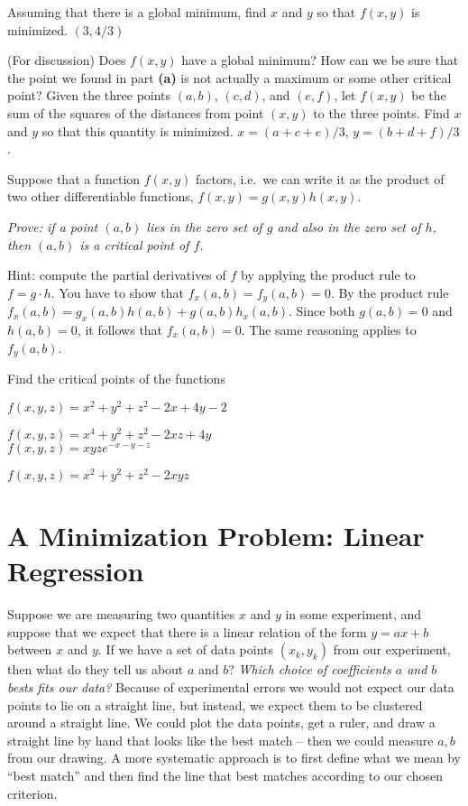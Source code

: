 \begin{multicols}{2}
\subprob Assuming that there is a global minimum, find $x$ and $y$ so that $f(x,y)$  is minimized. 
\answer  $(3,4/3)$  
\endanswer

\subprob (For discussion)  Does $f(x,y)$ have a global minimum?  How can we be sure
that the point we found in part \textbf{(a)} is not actually a maximum or some other
critical point?
%
\subprob Given the three points $(a, b)$, $(c, d)$, and $(e, f)$,  
let $f(x, y)$ be the sum of the squares of the distances from point
$(x,y)$ to the three points.  Find $x$ and $y$ so that this quantity is
minimized. 
\answer
$x= (a+c+e)/3$, $y=(b+d+f)/3$.  
\endanswer

\problem Suppose that a function $f(x, y)$ factors, i.e.~we can write it as the
product of two other differentiable functions, $f(x, y) = g(x, y)h(x, y)$.

\textit{Prove: if a point $(a, b)$ lies in the zero set of $g$ and also in the
zero set of $h$, then $(a,b)$ is a critical point of $f$.}

\noindent%
Hint: compute the partial derivatives of $f$ by applying the product rule to $f=g\cdot h$.
\answer
You have to show that $f_x(a, b) = f_y(a, b) = 0$.
By the product rule $f_x(a, b) = g_x(a, b)h(a, b) + g(a, b) h_x(a,
b)$.  Since both $g(a, b) = 0$ and $h(a, b) = 0$, it follows that
$f_x(a, b) = 0$.   The same reasoning applies to $f_y(a, b)$.
\endanswer

\problem Find the critical points of the functions 

\subprob $  f(x, y, z) = x^2 + y^2 + z^2 - 2x + 4y -2$ 

\subprob $  f(x, y, z) = x^4 + y^2 + z^2 - 2xz + 4y$ \\

\subprob $  f(x, y, z) = xyze^{-x-y-z}$ 

\subprob $f(x,y,z) = x^2+y^2+z^2 - 2xyz$ 



\noproblemfont
\end{multicols}
\section{A Minimization Problem: Linear Regression}

\label{sec:linear-regression}

Suppose we are measuring two quantities $x$ and $y$ in some experiment, and
suppose that we expect that there is a linear relation of the form $y=ax+b$
between $x$ and $y$.  If we have a set of data points $(x_k, y_k)$ from our
experiment, then what do they tell us about $a$ and $b$?  \emph{Which choice of
  coefficients $a$ and $b$ bests fits our data? } Because of experimental errors
we would not expect our data points to lie on a straight line, but instead, we
expect them to be clustered around a straight line.  We could plot the data
points, get a ruler, and draw a straight line by hand that looks like the best
match -- then we could measure $a,b$ from our drawing.  A more systematic
approach is to first define what we mean by ``best match'' and then find the
line that best matches according to our chosen criterion.

